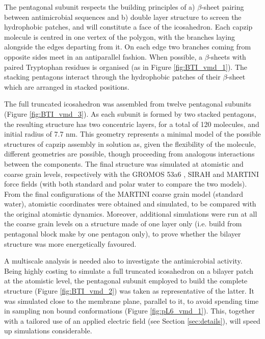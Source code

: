 The pentagonal subunit respects the building principles of a) $\beta$-sheet pairing between antimicrobial sequences and b) double layer structure to screen the hydrophobic patches, and will constitute a face of the icosahedron.
%
Each capzip molecule is centred in one vertex of the polygon, with the branches laying alongside the edges departing from it. On each edge two branches coming from opposite sides meet in an antiparallel fashion. When possible, a $\beta$-sheets with paired Tryptophan residues is organised (as in Figure \ref{fig:BTI_vmd_1}). The stacking pentagons interact through the hydrophobic patches of their $\beta$-sheet which are arranged in stacked positions.

The full truncated icosahedron was assembled from twelve pentagonal subunits (Figure \ref{fig:BTI_vmd_3}). As each subunit is formed by two stacked pentagons, the resulting structure has two concentric layers, for a total of 120 molecules, and initial radius of 7.7 nm.
%
This geometry represents a minimal model of the possible structures of capzip assembly in solution as, given the flexibility of the molecule, different geometries are possible, though proceeding from analogous interactions between the components.
%
The final structure was simulated at atomistic and coarse grain levels, respectively with the GROMOS 53a6 \cite{Oostenbrink2004}, SIRAH \cite{Machado2018} and MARTINI \cite{Marrink2007, Monticelli2008} force fields (with both standard and polar water \cite{Yesylevskyy2010} to compare the two models).
From the final configurations of the MARTINI coarse grain model (standard water), atomistic coordinates were obtained and simulated, to be compared with the original atomistic dynamics.
%
Moreover, additional simulations were run at all the coarse grain levels on a structure made of one layer only (i.e. build from pentagonal block make by one pentagon only), to prove whether the bilayer structure was more energetically favoured.

A multiscale analysis is needed also to investigate the antimicrobial activity. Being highly costing to simulate a full truncated icosahedron on a bilayer patch at the atomistic level, the pentagonal subunit employed to build the complete structure (Figure \ref{fig:BTI_vmd_2}) was taken as representative of the latter. It was simulated close to the membrane plane, parallel to it, to avoid spending time in sampling non bound conformations (Figure \ref{fig:pL6_vmd_1}). This, together with a tailored use of an applied electric field (see Section \ref{sec:details}), will speed up simulations considerable.

